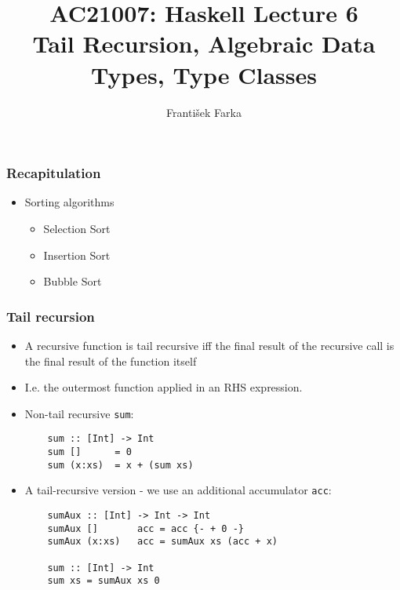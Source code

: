 \documentclass[final,handout]{beamer}
\title[Haskell Lecture 6]{AC21007: Haskell Lecture 6\\
    Tail Recursion, Algebraic Data Types, Type Classes
}
\author[Franti\v{s}ek Farka]{Franti\v{s}ek Farka}
\date{}
\newcommand\BackgroundPicture[1]{%
  \setbeamertemplate{background}{%
   \parbox[c][\paperheight]{\paperwidth}{%
      \vfill \hfill
\texttt{[image: \#1]}
        \hfill \vfill
     }}}
\begin{document}
\BackgroundPicture{fondo1.png}
\begin{frame}
\titlepage
\end{frame}

\begin{frame}[fragile]
    \frametitle{Recapitulation}

    \begin{itemize}
        \item Sorting algorithms
            \begin{itemize}
                \item Selection Sort
                \item Insertion Sort
                \item Bubble Sort
            \end{itemize}
  \end{itemize}
\end{frame}  


\begin{frame}[fragile]
    \frametitle{Tail recursion}

    \begin{itemize}
        \item A recursive function is tail recursive iff the final result of the
            recursive call is the final result of the function itself
        \item I.e. the outermost function applied in an RHS expression.

        \item<2-> Non-tail recursive \texttt{sum}:
        \begin{lstlisting}
    sum :: [Int] -> Int
    sum []      = 0
    sum (x:xs)  = x + (sum xs)
        \end{lstlisting}

    \item<3-> A tail-recursive version - we use an additional accumulator \texttt{acc}:
            \begin{lstlisting}
    sumAux :: [Int] -> Int -> Int
    sumAux []       acc = acc {- + 0 -}
    sumAux (x:xs)   acc = sumAux xs (acc + x)

    sum :: [Int] -> Int
    sum xs = sumAux xs 0
            \end{lstlisting}

    \end{itemize}
\end{frame}
\end{document}
